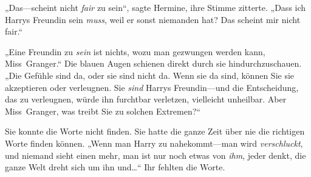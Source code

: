 „Das—scheint nicht \emph{fair} zu sein“, sagte Hermine, ihre Stimme zitterte. „Dass ich Harrys Freundin sein \emph{muss}, weil er sonst niemanden hat? Das scheint mir nicht fair.“

„Eine Freundin zu \emph{sein} ist nichts, wozu man gezwungen werden kann, Miss~Granger.“ Die blauen Augen schienen direkt durch sie hindurchzuschauen. „Die Gefühle sind da, oder sie sind nicht da. Wenn sie da sind, können Sie sie akzeptieren oder verleugnen. Sie \emph{sind} Harrys Freundin—und die Entscheidung, das zu verleugnen, würde ihn furchtbar verletzen, vielleicht unheilbar. Aber Miss~Granger, was treibt Sie zu solchen Extremen?“

Sie konnte die Worte nicht finden. Sie hatte die ganze Zeit über nie die richtigen Worte finden können. „Wenn man Harry zu nahekommt—man wird \emph{verschluckt}, und niemand sieht einen mehr, man ist nur noch etwas von \emph{ihm}, jeder denkt, die ganze Welt dreht sich um ihn und…“ Ihr fehlten die Worte.


